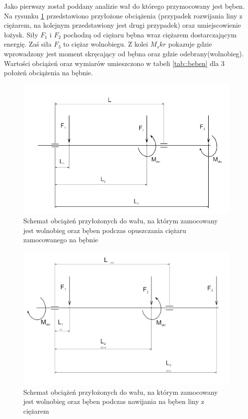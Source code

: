         	Jako pierwszy został poddany analizie wał do którego przymocowany jest bęben.
        	Na rysunku \ref{fig::shaft_beben} przedstawiono przyłożone obciążenia (przypadek rozwijania liny z ciężarem, na kolejnym przedstawiony jest drugi przypadek) oraz umiejscowienie łożysk. Siły $F_1$ i $F_2$ pochodzą od ciężaru bębna wraz ciężarem dostarczającym energię.
        	Zaś siła $F_3$ to ciężar wolnobiegu.
        	Z kolei $M_skr$ pokazuje gdzie wprowadzony jest moment skręcający od bębna oraz gdzie odebrany(wolnobieg).
        	Wartości obciążeń oraz wymiarów umieszczono w tabeli \ref{tab::beben} dla 3 położeń obciążenia na bębnie.
        	
        	
        
        
        	\begin{figure}[th]
        		\centering
        		\includegraphics[width=0.9\linewidth]{Projekt/shaft_beben}
        		\caption{Schemat obciążeń przyłożonych do wału, na którym zamocowany jest wolnobieg oraz bęben podczas opuszczania ciężaru zamocowanego na bębnie} 
        		\label{fig::shaft_beben}
        	\end{figure}
        	\begin{figure}[th]
				\centering
				\includegraphics[width=0.9\linewidth]{Projekt/shaft_beben2}
				\caption{Schemat obciążeń przyłożonych do wału, na którym zamocowany jest wolnobieg oraz bęben podczas nawijania na bęben liny z ciężarem} 
				\label{fig::shaft_beben2}
			\end{figure}        
        
